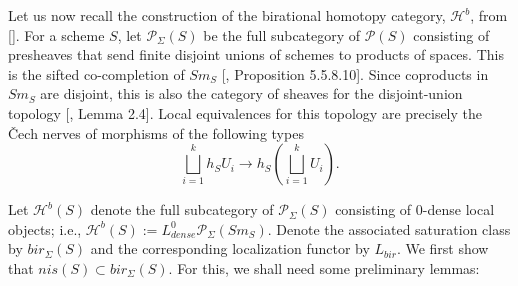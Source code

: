 Let us now recall the construction of the birational homotopy category, $\mathcal{H}^b$, from [\cite{0bat}]. For a scheme $S$, let $\mathcal{P}_\Sigma(S)$ be the full subcategory of $\mathcal{P}(S)$ consisting of presheaves that send finite disjoint unions of schemes to products of spaces. This is the sifted co-completion of $Sm_S$ [\cite{lurie2009higher}, Proposition 5.5.8.10]. Since coproducts in $Sm_S$ are disjoint, this is also the category of sheaves for the disjoint-union topology [\cite{bachmann2017norms}, Lemma 2.4]. Local equivalences for this topology are precisely the \v{C}ech nerves of morphisms of the following types $$\bigsqcup _{i=1}^kh_S{U_i}\to h_S({\bigsqcup _{i=1}^kU_i}).$$ 

Let $\mathcal{H}^b(S)$ denote the full subcategory of $\mathcal{P}_\Sigma(S)$ consisting of $0$-dense local objects; i.e., $\mathcal{H}^b(S):=L^0_{dense}\mathcal{P}_\Sigma(Sm_S)$. Denote the associated saturation class by $bir_\Sigma(S)$ and the corresponding localization functor by $L_{bir}$. We first show that $nis(S)\subset bir_\Sigma(S)$. For this, we shall need some preliminary lemmas:

